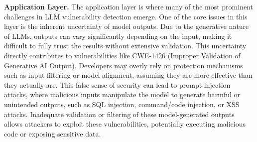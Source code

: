 
\noindent \textbf{Application Layer.}   
The application layer is where many of the most prominent challenges in LLM vulnerability detection emerge. One of the core issues in this layer is the inherent uncertainty of model outputs. Due to the generative nature of LLMs, outputs can vary significantly depending on the input, making it difficult to fully trust the results without extensive validation. This uncertainty directly contributes to vulnerabilities like CWE-1426 (Improper Validation of Generative AI Output). Developers may overly rely on protection mechanisms such as input filtering or model alignment, assuming they are more effective than they actually are. This false sense of security can lead to prompt injection attacks, where malicious inputs manipulate the model to generate harmful or unintended outputs, such as SQL injection, command/code injection, or XSS attacks. Inadequate validation or filtering of these model-generated outputs allows attackers to exploit these vulnerabilities, potentially executing malicious code or exposing sensitive data.

